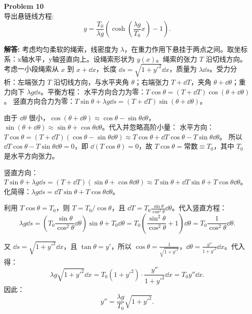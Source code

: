 \documentclass[12pt, a4paper, oneside]{ctexart}
\newenvironment{solution}{\par\noindent\textbf{解答:}\quad}{\par}
\begin{document}
\begin{mdframed}[backgroundcolor=gray!10, linewidth=0pt]
    \textbf{Problem 10} \\
    导出悬链线方程:
    \[
    y = \frac{T_0}{\lambda g} \left( \cosh\left( \frac{\lambda g}{T_0} x \right) - 1 \right).
    \]
\end{mdframed}
\begin{solution}
    考虑均匀柔软的绳索，线密度为 \(\lambda\)，在重力作用下悬挂于两点之间。取坐标系：x轴水平，y轴竖直向上。设绳索形状为 \(y(x)\)。绳索的张力 \(T\) 沿切线方向。考虑一小段绳索从 \(x\) 到 \(x+\dd x\)，长度 \(\dd s = \sqrt{1+y'^2} \dd x\)，质量为 \(\lambda \dd s\)。受力分析：左端张力 \(T\) 沿切线方向，与水平夹角 \(\theta\)；右端张力 \(T+\dd T\)，夹角 \(\theta+\dd \theta\)；重力向下 \(\lambda g \dd s\)。平衡方程：
    水平方向合力为零：\(T \cos\theta = (T+\dd T) \cos(\theta+\dd \theta)\)。
    竖直方向合力为零：\(T \sin\theta + \lambda g \dd s = (T+\dd T) \sin(\theta+\dd \theta)\)。
    
    由于 \(\dd \theta\) 很小，\(\cos(\theta+\dd \theta) \approx \cos\theta - \sin\theta \dd \theta\)，\(\sin(\theta+\dd \theta) \approx \sin\theta + \cos\theta \dd \theta\)。代入并忽略高阶小量：
    水平方向：\(T \cos\theta = (T+\dd T)(\cos\theta - \sin\theta \dd \theta) \approx T \cos\theta + \dd T \cos\theta - T \sin\theta \dd \theta\)。
    所以 \(\dd T \cos\theta - T \sin\theta \dd \theta = 0\)，即 \(\dd(T \cos\theta) = 0\)，故 \(T \cos\theta = \text{常数} \equiv T_0\)，其中 \(T_0\) 是水平方向张力。
    
    竖直方向：\(T \sin\theta + \lambda g \dd s = (T+\dd T)(\sin\theta + \cos\theta \dd \theta) \approx T \sin\theta + \dd T \sin\theta + T \cos\theta \dd \theta\)。
    化简得：\(\lambda g \dd s = \dd T \sin\theta + T \cos\theta \dd \theta\)。
    
    利用 \(T \cos\theta = T_0\)，则 \(T = T_0 / \cos\theta\)，且 \(\dd T = T_0 \frac{\sin\theta}{\cos^2\theta} \dd \theta\)。代入竖直方程：
    \[
    \lambda g \dd s = \left( T_0 \frac{\sin\theta}{\cos^2\theta} \dd \theta \right) \sin\theta + T_0 \dd \theta = T_0 \left( \frac{\sin^2\theta}{\cos^2\theta} + 1 \right) \dd \theta = T_0 \frac{1}{\cos^2\theta} \dd \theta.
    \]
    
    又 \(\dd s = \sqrt{1+y'^2} \dd x\)，且 \(\tan\theta = y'\)，所以 \(\cos\theta = \frac{1}{\sqrt{1+y'^2}}\)，\(\dd \theta = \frac{y''}{1+y'^2} \dd x\)。代入得：
    \[
    \lambda g \sqrt{1+y'^2} \dd x = T_0 (1+y'^2) \cdot \frac{y''}{1+y'^2} \dd x = T_0 y'' \dd x.
    \]
    因此：
    \[
    y'' = \frac{\lambda g}{T_0} \sqrt{1+y'^2}.
    \]
    

\end{solution}
\end{document}
